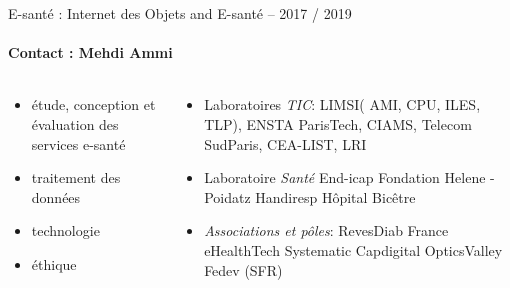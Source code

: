 \begin{frame}{E-santé : Internet des Objets and E-santé -- 2017 / 2019}
\framesubtitle{Contact : Mehdi Ammi}
%
\vspace{-1cm}
{\color{blue} }
%
%
\begin{columns}
  \begin{column}{6cm}
    \begin{itemize}
    \item étude, conception et évaluation des services e-santé
    \item traitement des données
    \item technologie
    \item éthique
    \end{itemize}
  \end{column}
  \begin{column}{7cm}
    \begin{itemize}
    \item Laboratoires \textit{TIC}: LIMSI( AMI, CPU, ILES, TLP),
      ENSTA ParisTech, CIAMS, Telecom SudParis, CEA-LIST, LRI
    \item Laboratoire \textit{Santé} End-icap Fondation Helene -
      Poidatz Handiresp Hôpital Bicêtre
    \item \textit{Associations et pôles}: RevesDiab France eHealthTech
      Systematic Capdigital OpticsValley Fedev (SFR)
    \end{itemize}
  \end{column}
\end{columns}
\end{frame}


